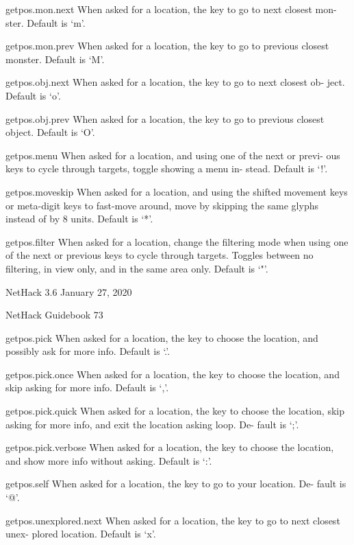 \documentclass[11pt]{article}
\begin{document}
getpos.mon.next
 When asked for a location, the key to go to next closest mon-
 ster. Default is `m'.

getpos.mon.prev
 When asked for a location, the key to go to previous closest
 monster. Default is `M'.

getpos.obj.next
 When asked for a location, the key to go to next closest ob-
 ject. Default is `o'.

getpos.obj.prev
 When asked for a location, the key to go to previous closest
 object. Default is `O'.

getpos.menu
 When asked for a location, and using one of the next or previ-
 ous keys to cycle through targets, toggle showing a menu in-
 stead. Default is `!'.

getpos.moveskip
 When asked for a location, and using the shifted movement keys
 or meta-digit keys to fast-move around, move by skipping the
 same glyphs instead of by 8 units. Default is `*'.

getpos.filter
 When asked for a location, change the filtering mode when using
 one of the next or previous keys to cycle through targets.
 Toggles between no filtering, in view only, and in the same
 area only. Default is `"'.



NetHack 3.6                   January 27, 2020





NetHack Guidebook                       73



getpos.pick
 When asked for a location, the key to choose the location, and
 possibly ask for more info. Default is `.'.

getpos.pick.once
 When asked for a location, the key to choose the location, and
 skip asking for more info. Default is `,'.

getpos.pick.quick
 When asked for a location, the key to choose the location, skip
 asking for more info, and exit the location asking loop. De-
 fault is `;'.

getpos.pick.verbose
 When asked for a location, the key to choose the location, and
 show more info without asking. Default is `:'.

getpos.self
 When asked for a location, the key to go to your location. De-
 fault is `@'.

getpos.unexplored.next
 When asked for a location, the key to go to next closest unex-
 plored location. Default is `x'.
\end{document}
